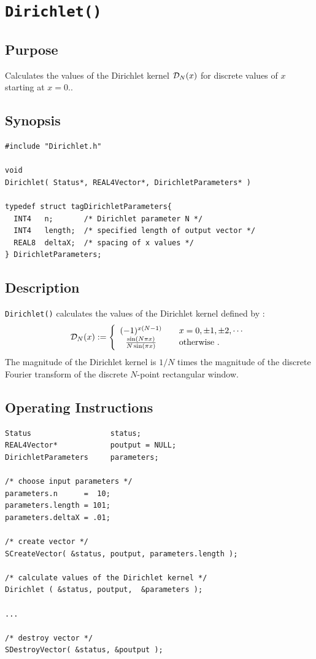 \documentclass{article}
\begin{document}
\section{{\tt Dirichlet()}}

\subsection{Purpose}

Calculates the values of the Dirichlet kernel ${\cal D}_N(x)$ for 
discrete values of $x$ starting at $x=0$..

\subsection{Synopsis}


\begin{verbatim}
#include "Dirichlet.h"

void 
Dirichlet( Status*, REAL4Vector*, DirichletParameters* )

typedef struct tagDirichletParameters{
  INT4   n;       /* Dirichlet parameter N */
  INT4   length;  /* specified length of output vector */
  REAL8  deltaX;  /* spacing of x values */
} DirichletParameters; 
\end{verbatim}

\subsection{Description}

{\tt Dirichlet()} calculates the values of the Dirichlet kernel
defined by \cite{PW}:
%
\[
{\cal D}_N(x):=
\left\{
\begin{array}{cl}
(-1)^{x(N-1)} & \quad x=0, \pm 1, \pm 2, \cdots\\
{\sin(N\pi x)\over N\sin(\pi x)} & \quad {\rm otherwise}\ .
\end{array}
\right.
\]
%
The magnitude of the Dirichlet kernel is $1/N$ times the magnitude 
of the discrete Fourier transform of the discrete $N$-point rectangular 
window.

\subsection{Operating Instructions}


\begin{verbatim}
Status                  status; 
REAL4Vector*            poutput = NULL; 
DirichletParameters     parameters;

/* choose input parameters */
parameters.n      =  10;
parameters.length = 101;
parameters.deltaX = .01;

/* create vector */
SCreateVector( &status, poutput, parameters.length );

/* calculate values of the Dirichlet kernel */
Dirichlet ( &status, poutput,  &parameters ); 

...

/* destroy vector */
SDestroyVector( &status, &poutput );
\end{verbatim}
\end{document}

